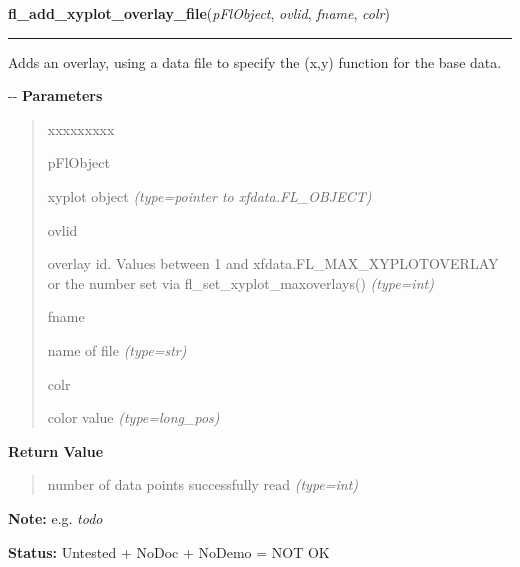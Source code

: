     \label{xformslib:flxyplot:fl_add_xyplot_overlay_file}

    \vspace{0.5ex}

\hspace{.8\funcindent}\begin{boxedminipage}{\funcwidth}

    \raggedright \textbf{fl\_add\_xyplot\_overlay\_file}(\textit{pFlObject}, \textit{ovlid}, \textit{fname}, \textit{colr})

    \vspace{-1.5ex}

    \rule{\textwidth}{0.5\fboxrule}
\setlength{\parskip}{2ex}

Adds an overlay, using a data file to specify the (x,y) function for
the base data.

-{}-
\setlength{\parskip}{1ex}
      \textbf{Parameters}
      \vspace{-1ex}

      \begin{quote}
        \begin{Ventry}{xxxxxxxxx}

          \item[pFlObject]


xyplot object
            {\it (type=pointer to xfdata.FL\_OBJECT)}

          \item[ovlid]


overlay id. Values between 1 and xfdata.FL\_MAX\_XYPLOTOVERLAY or the
number set via fl\_set\_xyplot\_maxoverlays()
            {\it (type=int)}

          \item[fname]


name of file
            {\it (type=str)}

          \item[colr]


color value
            {\it (type=long\_pos)}

        \end{Ventry}

      \end{quote}

      \textbf{Return Value}
    \vspace{-1ex}

      \begin{quote}

number of data points successfully read
      {\it (type=int)}

      \end{quote}

\textbf{Note:} 
e.g. \emph{todo}


\textbf{Status:} 
Untested + NoDoc + NoDemo = NOT OK


    \end{boxedminipage}

